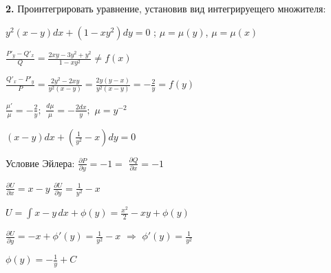 \documentclass[a4paper]{article}
\begin{document}
\vspace{1cm}

\textbf{2.} Проинтегрировать уравнение, установив вид интегрируещего множителя:

\vspace{0.3cm}

$\displaystyle y^2(x-y)dx+(1-xy^2)dy=0$ ; $\mu=\mu(y)$, $\mu=\mu(x)$

\vspace{0.3cm}

$\displaystyle \frac{P'_y-Q'_x}{Q}=\frac{2xy-3y^2+y^2}{1-xy^2}\neq f(x)$

\vspace{0.3cm}

$\displaystyle \frac{Q'_x-P'_y}{P}=\frac{2y^2-2xy}{y^2(x-y)}=\frac{2y(y-x)}{y^2(x-y)}=-\frac{2}{y}=f(y)$

\vspace{0.3cm}

$\displaystyle \frac{\mu'}{\mu}=-\frac{2}{y};$ \hspace{0.7cm} $\displaystyle \frac{d\mu}{\mu}=-\frac{2dx}{y};$ \hspace{0.7cm} $\displaystyle \mu=y^{-2}$

\vspace{0.3cm}

$\displaystyle (x-y)dx+(\frac{1}{y^2}-x)dy=0$

\vspace{0.3cm}

Условие Эйлера: $\displaystyle \frac{\partial P}{\partial y} = -1  =$ $\displaystyle \frac{\partial Q}{\partial x} = -1$

\vspace{0.3cm}

$\displaystyle \frac{\partial U}{\partial x} = x-y $ \hspace{0.7cm} $\displaystyle \frac{\partial U}{\partial y} = \frac{1}{y^2}-x$

\vspace{0.3cm}

$\displaystyle U=\int\limits x-y\,dx+\phi(y)=\frac{x^2}{2}-xy+\phi(y)$

\vspace{0.3cm}

$\displaystyle \frac{\partial U}{\partial y}=-x+\phi'(y)=\frac{1}{y^2}-x$ $\Rightarrow$ $\phi'(y)=\frac{1}{y^2}$

\vspace{0.3cm}

$\displaystyle \phi(y)=-\frac{1}{y}+C$
     
\end{document}
